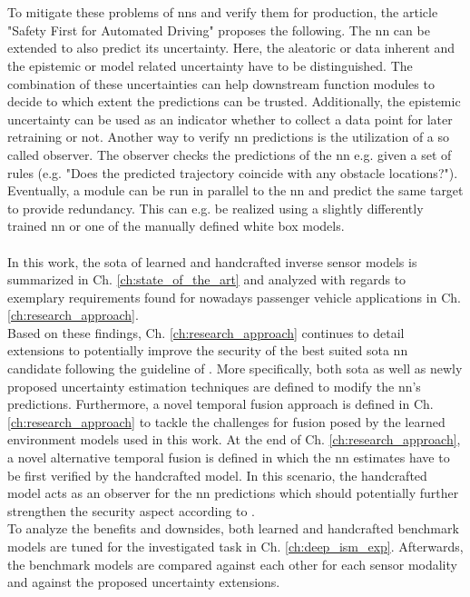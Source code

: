 \\\\
To mitigate these problems of \gls{nn}s and verify them for production, the article "Safety First for Automated Driving" \cite{safetyfirst2019} proposes the following. The \gls{nn} can be extended to also predict its uncertainty. Here, the aleatoric or data inherent and the epistemic or model related uncertainty have to be distinguished. The combination of these uncertainties can help downstream function modules to decide to which extent the predictions can be trusted. Additionally, the epistemic uncertainty can be used as an indicator whether to collect a data point for later retraining or not. Another way to verify \gls{nn} predictions is the utilization of a so called observer. The observer checks the predictions of the \gls{nn} e.g. given a set of rules (e.g. "Does the predicted trajectory coincide with any obstacle locations?"). Eventually, a module can be run in parallel to the \gls{nn} and predict the same target to provide redundancy. This can e.g. be realized using a slightly differently trained \gls{nn} or one of the manually defined white box models.
\\\\
In this work, the \gls{sota} of learned and handcrafted inverse sensor models is summarized in Ch. \ref{ch:state_of_the_art} and analyzed with regards to exemplary requirements found for nowadays passenger vehicle applications in Ch. \ref{ch:research_approach}.\\ 
Based on these findings, Ch. \ref{ch:research_approach} continues to detail extensions to potentially improve the security of the best suited \gls{sota} \gls{nn} candidate following the guideline of \cite{safetyfirst2019}. More specifically, both \gls{sota} as well as newly proposed uncertainty estimation techniques are defined to modify the \gls{nn}'s predictions. Furthermore, a novel temporal fusion approach is defined in Ch. \ref{ch:research_approach} to tackle the challenges for fusion posed by the learned environment models used in this work. At the end of Ch. \ref{ch:research_approach}, a novel alternative temporal fusion is defined in which the \gls{nn} estimates have to be first verified by the handcrafted model. In this scenario, the handcrafted model acts as an observer for the \gls{nn} predictions which should potentially further strengthen the security aspect according to \cite{safetyfirst2019}.\\
To analyze the benefits and downsides, both learned and handcrafted benchmark models are tuned for the investigated task in Ch. \ref{ch:deep_ism_exp}. Afterwards, the benchmark models are compared against each other for each sensor modality and against the proposed uncertainty extensions.\\
